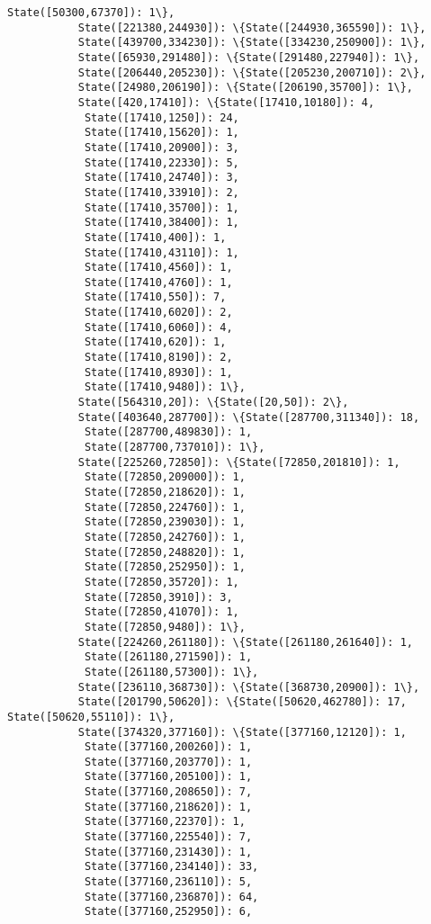 \documentclass[11pt]{article}
\begin{document}
\begin{Verbatim}[commandchars=\\\{\}]
            State([50300,67370]): 1\},
           State([221380,244930]): \{State([244930,365590]): 1\},
           State([439700,334230]): \{State([334230,250900]): 1\},
           State([65930,291480]): \{State([291480,227940]): 1\},
           State([206440,205230]): \{State([205230,200710]): 2\},
           State([24980,206190]): \{State([206190,35700]): 1\},
           State([420,17410]): \{State([17410,10180]): 4,
            State([17410,1250]): 24,
            State([17410,15620]): 1,
            State([17410,20900]): 3,
            State([17410,22330]): 5,
            State([17410,24740]): 3,
            State([17410,33910]): 2,
            State([17410,35700]): 1,
            State([17410,38400]): 1,
            State([17410,400]): 1,
            State([17410,43110]): 1,
            State([17410,4560]): 1,
            State([17410,4760]): 1,
            State([17410,550]): 7,
            State([17410,6020]): 2,
            State([17410,6060]): 4,
            State([17410,620]): 1,
            State([17410,8190]): 2,
            State([17410,8930]): 1,
            State([17410,9480]): 1\},
           State([564310,20]): \{State([20,50]): 2\},
           State([403640,287700]): \{State([287700,311340]): 18,
            State([287700,489830]): 1,
            State([287700,737010]): 1\},
           State([225260,72850]): \{State([72850,201810]): 1,
            State([72850,209000]): 1,
            State([72850,218620]): 1,
            State([72850,224760]): 1,
            State([72850,239030]): 1,
            State([72850,242760]): 1,
            State([72850,248820]): 1,
            State([72850,252950]): 1,
            State([72850,35720]): 1,
            State([72850,3910]): 3,
            State([72850,41070]): 1,
            State([72850,9480]): 1\},
           State([224260,261180]): \{State([261180,261640]): 1,
            State([261180,271590]): 1,
            State([261180,57300]): 1\},
           State([236110,368730]): \{State([368730,20900]): 1\},
           State([201790,50620]): \{State([50620,462780]): 17, State([50620,55110]): 1\},
           State([374320,377160]): \{State([377160,12120]): 1,
            State([377160,200260]): 1,
            State([377160,203770]): 1,
            State([377160,205100]): 1,
            State([377160,208650]): 7,
            State([377160,218620]): 1,
            State([377160,22370]): 1,
            State([377160,225540]): 7,
            State([377160,231430]): 1,
            State([377160,234140]): 33,
            State([377160,236110]): 5,
            State([377160,236870]): 64,
            State([377160,252950]): 6,

\end{Verbatim}
\end{document}
